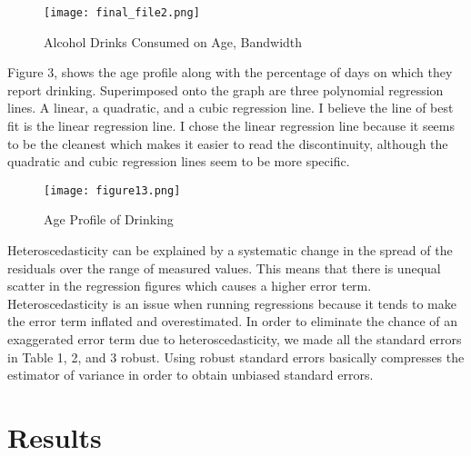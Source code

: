 \documentclass[a4paper]{article}
\begin{document}
\begin{figure}[H]
    \centering
    \caption{Alcohol Drinks Consumed on Age, Bandwidth}
    \texttt{[image: final\_file2.png]}
    \label{fig:my_label}
\end{figure}

\par
Figure 3, shows the age profile along with the percentage of days on which they report drinking. Superimposed onto the graph are three polynomial regression lines. A linear, a quadratic, and a cubic regression line. I believe the line of best fit is the linear regression line. I chose the linear regression line because it seems to be the cleanest which makes it easier to read the discontinuity, although the quadratic and cubic regression lines seem to be more specific. 

\begin{figure}[h!]
    \centering
    \caption{Age Profile of Drinking}
    \texttt{[image: figure13.png]}
    \label{fig:my_label}
\end{figure}

\par 
Heteroscedasticity can be explained by a systematic change in the spread of the residuals over the range of measured values. This means that there is unequal scatter in the regression figures which causes a higher error term. Heteroscedasticity is an issue when running regressions because it tends to make the error term inflated and overestimated. In order to eliminate the chance of an exaggerated error term due to heteroscedasticity, we made all the standard errors in Table 1, 2, and 3 robust. Using robust standard errors basically compresses the estimator of variance in order to obtain unbiased standard errors. 

\section{Results}
\end{document}
